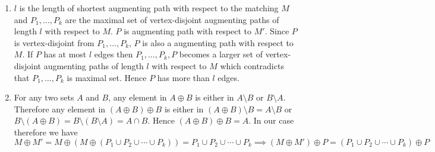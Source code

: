 \documentclass[a4paper, 11pt]{article}
\begin{document}
{\begin{enumerate}[label=\bfseries\alph*.]
\begin{itemize}
 
\item   Let $C$ be a cycle in $G'$. Now let $(u,v)$ and $(v,w)$ are consecutive edges in $C$. Since the edges of $G'$ are from $M$ and $M^*$, $(u,v), (v,w)\in M\oplus  M^*$. Now both edges can not appear in the same matching. Therefore in $C$ the edges alternate between $M$ and $M^*$. Since the edges alternate $C$ must have same number of edges from both matching. \parinn
  
   
  Let $P$ be any path in $G'$. Now let $(u,v)$ and $(v,w)$ are consecutive edges in $P$. Since the edges of $G'$ are from $M$ and $M^*$, $(u,v), (v,w)\in M\oplus  M^*$. Now both edges can not appear in the same matching. Therefore in $P$ the edges alternate between $M$ and $M^*$. Now for $P$ both the starting and ending edge can belong to same matching or they can be from different matching. In first case $P$ has one more edge from  a matching than the other one and in the second case $P$ has equal number of edges from both matching. Hence any path can have at most one more edge from a matching than the other. 
  
  Since $|M^*|\geq |M|$. The only connected components which leads to difference between the $|M|$ and $|M^*|$ are paths. Each path which starts and ends with edges from $M^*$ has one more edge from $M^*$ than $M$ and these paths are vertex-disjoint augmenting paths with respect to $M$. Therefore there are at least $|M^*|-|M|$ vertex-disjoint augmenting paths.
\end{itemize}
  \item  $l$ is the length of shortest augmenting path with respect to the matching $M$ and $P_1,\dots, P_k$ are the maximal set of vertex-disjoint augmenting paths of length $l$ with respect to $M$. $P$ is augmenting path with respect to $M'$. Since $P$ is vertex-disjoint from $P_1,\dots, P_k$, $P$ is also a augmenting path with respect to $M$. If $P$ has at most $l$ edges then $P_1,\dots, P_k, P$ becomes a larger set of vertex-disjoint augmenting paths of length $l$ with respect to $M$ which contradicts that $P_1,\dots, P_k$ is maximal set. Hence $P$ has more than $l$ edges.
\item For any two sets $A$ and $B$, any element in $A\oplus B$ is either in $A\setminus B$ or $B\setminus A$. Therefore any element in $(A\oplus B)\oplus B$ is either in $(A\oplus B)\setminus B=A\setminus B$ or $B\setminus (A\oplus B)=B\setminus (B\setminus A)=A\cap B$. Hence $(A\oplus B)\oplus B=A$. In our case therefore we have  $$M\oplus M'=M\oplus (M\oplus (P_1\cup P_2\cup \cdots \cup P_k))=P_1\cup P_2\cup \cdots \cup P_k\implies (M\oplus M')\oplus P=(P_1\cup P_2\cup \cdots \cup P_k)\oplus P$$\parinn


\end{enumerate}}
\end{document}
